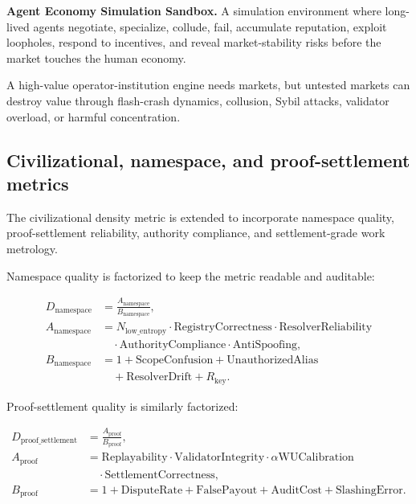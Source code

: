 \textbf{Agent Economy Simulation Sandbox.} A simulation environment
where long-lived agents negotiate, specialize, collude, fail, accumulate
reputation, exploit loopholes, respond to incentives, and reveal
market-stability risks before the market touches the human economy.

A high-value operator-institution engine needs markets, but untested
markets can destroy value through flash-crash dynamics, collusion, Sybil
attacks, validator overload, or harmful concentration.

\subsection{Civilizational, namespace, and proof-settlement
metrics}\label{civilizational-namespace-and-proof-settlement-metrics}

The civilizational density metric is extended to incorporate namespace
quality, proof-settlement reliability, authority compliance, and
settlement-grade work metrology.

Namespace quality is factorized to keep the metric readable and
auditable:

\[
\begin{aligned}
D_{\mathrm{namespace}}&=\frac{A_{\mathrm{namespace}}}{B_{\mathrm{namespace}}},\\
A_{\mathrm{namespace}}&=N_{\mathrm{low\_entropy}}
\cdot\mathrm{RegistryCorrectness}\cdot\mathrm{ResolverReliability}\\
&\quad\cdot\mathrm{AuthorityCompliance}\cdot\mathrm{AntiSpoofing},\\
B_{\mathrm{namespace}}&=1+\mathrm{ScopeConfusion}+\mathrm{UnauthorizedAlias}\\
&\quad+\mathrm{ResolverDrift}+R_{\mathrm{key}}.
\end{aligned}
\]

Proof-settlement quality is similarly factorized:

\[
\begin{aligned}
D_{\mathrm{proof\_settlement}}&=\frac{A_{\mathrm{proof}}}{B_{\mathrm{proof}}},\\
A_{\mathrm{proof}}&=\mathrm{Replayability}\cdot\mathrm{ValidatorIntegrity}
\cdot\alpha\mathrm{WUCalibration}\\
&\quad\cdot\mathrm{SettlementCorrectness},\\
B_{\mathrm{proof}}&=1+\mathrm{DisputeRate}+\mathrm{FalsePayout}+
\mathrm{AuditCost}+\mathrm{SlashingError}.
\end{aligned}
\]

